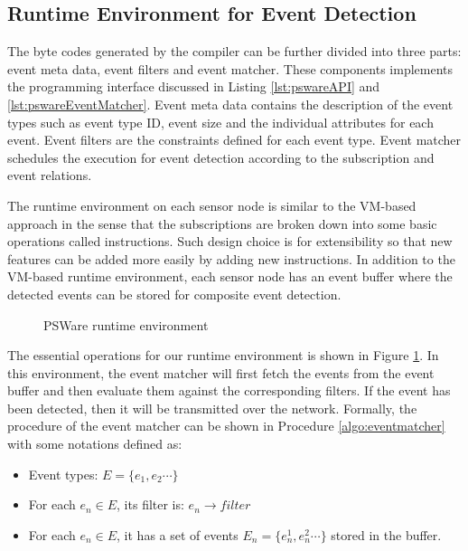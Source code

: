 \subsection{Runtime Environment for Event Detection}
The byte codes generated by the compiler can be further divided into three parts: event meta data, event filters and event matcher. These components implements the programming interface discussed in Listing \ref{lst:pswareAPI} and \ref{lst:pswareEventMatcher}. Event meta data contains the description of the event types such as event type ID, event size and the individual attributes for each event. Event filters are the constraints defined for each event type. Event matcher schedules the execution for event detection according to the subscription and event relations.

The runtime environment on each sensor node is similar to the VM-based approach \cite{mate} in the sense that the subscriptions are broken down into some basic operations called instructions. Such design choice is for extensibility so that new features can be added more easily by adding new instructions. In addition to the VM-based runtime environment, each sensor node has an event buffer where the detected events can be stored for composite event detection.

\begin{figure}
\centering
{}
\caption{PSWare runtime environment}
\label{fig:eventdetectionframework2}
\end{figure}
The essential operations for our runtime environment is shown in Figure \ref{fig:eventdetectionframework2}. In this environment, the event matcher will first fetch the events from the event buffer and then evaluate them against the corresponding filters. If the event has been detected, then it will be transmitted over the network. Formally, the procedure of the event matcher can be shown in Procedure \ref{algo:eventmatcher} with some notations defined as:
\begin{itemize}
\item Event types: \(E=\{e_1, e_2 \cdots \}\)
\item For each \(e_n\in E\), its filter is: \(e_n\rightarrow filter\)
\item For each \(e_n\in E\), it has a set of events \(E_n=\{e_n^1, e_n^2 \cdots \}\) stored in the buffer.
\end{itemize}

